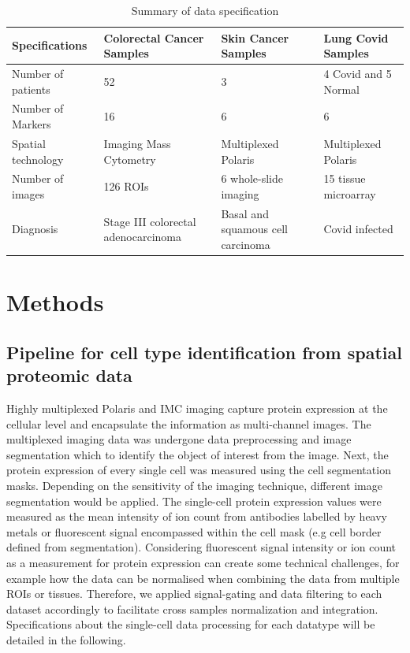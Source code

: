 \begin{table}[ht]
\centering
\caption{Summary of data specification}
\begin{tabular}{||P{4cm} || P{3cm} || P{3cm} || P{3cm} || } 
 \hline
 Specifications & Colorectal Cancer Samples & Skin Cancer Samples  & Lung Covid Samples \\ [0.33ex] 
 \hline\hline
 Number of patients & 52 & 3 & 4 Covid and 5 Normal \\ 
 \hline
 Number of Markers & 16  & 6  & 6 \\ 
 \hline
 Spatial technology & Imaging Mass Cytometry & Multiplexed Polaris & Multiplexed Polaris  \\ 
 \hline
 Number of images & 126 ROIs &  6 whole-slide imaging &  15 tissue microarray \\
 \hline
 Diagnosis & Stage III colorectal adenocarcinoma & Basal and squamous cell carcinoma & Covid infected \\ [1ex] 
 \hline
\end{tabular}
\label{table:Chapt3_DataInfor}
\end{table}
\section{Methods}
\subsection{Pipeline for cell type identification from spatial proteomic data}
\label{Sec:3.2_SP_celltype_id_pipeline}	%
Highly multiplexed Polaris and IMC imaging capture protein expression at the cellular level and encapsulate the information as multi-channel images. The multiplexed imaging data was undergone data preprocessing and image segmentation which to identify the object of interest from the image. Next, the protein expression of every single cell was measured using the cell segmentation masks. Depending on the sensitivity of the imaging technique, different image segmentation would be applied. The single-cell protein expression values were measured as the mean intensity of ion count from antibodies labelled by heavy metals or fluorescent signal encompassed within the cell mask (e.g cell border defined from segmentation). Considering fluorescent signal intensity or ion count as a measurement for protein expression can create some technical challenges, for example how the data can be normalised when combining the data from multiple ROIs or tissues. Therefore, we applied signal-gating and data filtering to each dataset accordingly to facilitate cross samples normalization and integration. Specifications about the single-cell data processing for each datatype will be detailed in the following.  

